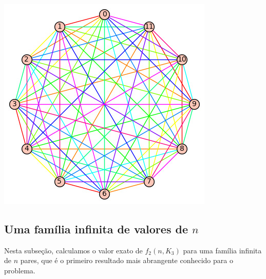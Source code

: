 \documentclass[11pt,twoside,a4paper]{book}
\theoremstyle{note}
\begin{document}
  \begin{center}
			\includegraphics[scale=0.7, keepaspectratio=true]{k12-12colors.jpeg}
			\label{fig:K12} 
	\end{center}
	
	\subsection{Uma família infinita de valores de $n$}
	Nesta subseção, calculamos o valor exato de $f_2(n, K_3)$ para uma família infinita de $n$ pares, que é o primeiro resultado mais abrangente conhecido para o problema.
\end{document}
